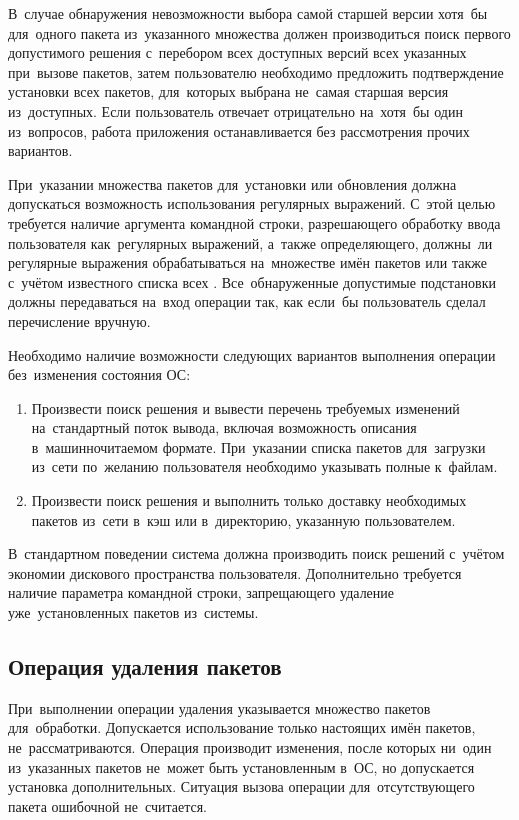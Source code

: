 В~случае обнаружения невозможности выбора самой старшей версии хотя~бы для~одного пакета из~указанного множества
должен производиться поиск первого допустимого решения с~перебором всех доступных версий всех указанных при~вызове пакетов,
затем пользователю необходимо предложить подтверждение установки всех пакетов, для~которых выбрана не~самая старшая версия из~доступных.
Если пользователь отвечает отрицательно на~хотя~бы один из~вопросов, работа приложения останавливается без рассмотрения прочих вариантов.

При~указании множества пакетов для~установки или обновления  должна допускаться возможность использования регулярных выражений.
С~этой целью требуется наличие аргумента командной строки,  разрешающего обработку ввода пользователя как~регулярных выражений,
а~также определяющего,  должны~ли регулярные выражения обрабатываться на~множестве имён пакетов или также с~учётом известного списка всех .
Все~обнаруженные допустимые подстановки должны передаваться на~вход операции так, как если~бы пользователь сделал перечисление вручную.

Необходимо наличие возможности следующих вариантов выполнения операции без~изменения состояния ОС:

\begin{enumerate}

\item {
Произвести поиск решения и вывести перечень требуемых изменений на~стандартный поток вывода,
включая возможность описания в~машинночитаемом формате.
При~указании списка пакетов для~загрузки из~сети по~желанию пользователя необходимо указывать полные  к~файлам.
}

\item {
Произвести поиск решения и выполнить только доставку необходимых пакетов из~сети в~кэш или в~директорию, указанную пользователем.
}

\end{enumerate}

В~стандартном поведении система должна производить поиск решений с~учётом экономии дискового пространства пользователя. 
Дополнительно требуется наличие параметра командной строки, запрещающего удаление уже~установленных пакетов из~системы. 

\subsection{Операция удаления пакетов}

При~выполнении операции удаления указывается множество пакетов для~обработки.
Допускается использование только настоящих имён пакетов,  не~рассматриваются.
Операция производит изменения, после которых ни~один из~указанных пакетов не~может быть установленным в~ОС,
но допускается установка дополнительных.
Ситуация вызова операции для~отсутствующего пакета ошибочной не~считается.

